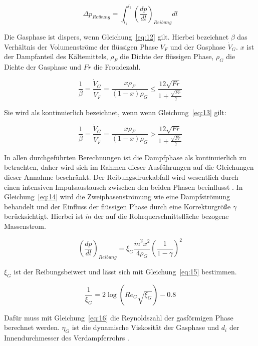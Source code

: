 \begin{equation}
\label{eq:11}
\Delta p_{Reibung} = \int_{l_1}^{l_2} \left( \frac{dp}{dl} \right)_{Reibung} dl
\end{equation}

\clearpage

Die Gasphase ist dispers, wenn Gleichung~\ref{eq:12} gilt. Hierbei bezeichnet $\beta$ das Verhältnis der Volumenströme der flüssigen Phase $\dot{V}_F$ und der Gasphase $\dot{V}_G$. $x$ ist der Dampfanteil des Kältemittels, $\rho_F$ die Dichte der flüssigen Phase, $\rho_G$ die Dichte der Gasphase und $Fr$ die Froudezahl.

\begin{equation}
\label{eq:12}
\frac{1}{\beta} = \frac{\dot{V}_G}{\dot{V}_F} = \frac{x\rho_F}{(1-x)\rho_G} \leq \frac{12\sqrt{Fr}}{1+\frac{\sqrt{Fr}}{7}}
\end{equation}

Sie wird als kontinuierlich bezeichnet, wenn wenn Gleichung~\ref{eq:13} gilt:

\begin{equation}
\label{eq:13}
\frac{1}{\beta} = \frac{\dot{V}_G}{\dot{V}_F} = \frac{x\rho_F}{(1-x)\rho_G} > \frac{12\sqrt{Fr}}{1+\frac{\sqrt{Fr}}{7}}
\end{equation}

In allen durchgeführten Berechnungen ist die Dampfphase als kontinuierlich zu betrachten, daher wird sich im Rahmen dieser Ausführungen auf die Gleichungen dieser Annahme beschränkt. Der Reibungsdruckabfall wird wesentlich durch einen intensiven Impulsaustausch zwischen den beiden Phasen beeinflusst \cite{Kesper.1976}. In Gleichung~\ref{eq:14} wird die Zweiphasenströmung wie eine Dampfströmung behandelt und der Einfluss der flüssigen Phase durch eine Korrekturgröße $\gamma$ berücksichtigt. Hierbei ist $\dot{m}$ der auf die Rohrquerschnittsfläche bezogene Massenstrom.

\begin{equation}
\label{eq:14}
\left( \frac{dp}{dl} \right)_{Reibung} = \xi_G \frac{\dot{m}^2 x^2}{4\rho_G} \left(\frac{1}{1-\gamma} \right)^2
\end{equation}

$\xi_G$ ist der Reibungsbeiwert und lässt sich mit Gleichung~\ref{eq:15} bestimmen.

\begin{equation}
\label{eq:15}
\frac{1}{\xi_G} = 2\log(Re_G \sqrt{\xi_G})-0.8
\end{equation}

Dafür muss mit Gleichung~\ref{eq:16} die Reynoldszahl der gasförmigen Phase berechnet werden. $\eta_G$ ist die dynamische Viskosität der Gasphase und $d_i$ der Innendurchmesser des Verdampferrohrs \cite{Awad.2012}.

